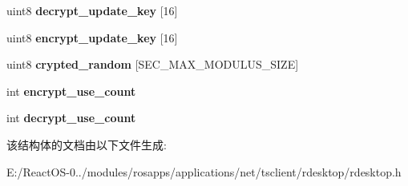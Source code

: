 \begin{DoxyCompactItemize}
\item 
\mbox{\label{structrdpclient_1_1secure___a1c40aa88dfaa8218e1d603a971c9988f}} 
uint8 {\bfseries decrypt\+\_\+update\+\_\+key} \mbox{[}16\mbox{]}
\item 
\mbox{\label{structrdpclient_1_1secure___ae2932b7561d9cf3202110db0490ae24f}} 
uint8 {\bfseries encrypt\+\_\+update\+\_\+key} \mbox{[}16\mbox{]}
\item 
\mbox{\label{structrdpclient_1_1secure___a4ef01c562df6eb7a27c66c1d5bf3df84}} 
uint8 {\bfseries crypted\+\_\+random} \mbox{[}S\+E\+C\+\_\+\+M\+A\+X\+\_\+\+M\+O\+D\+U\+L\+U\+S\+\_\+\+S\+I\+ZE\mbox{]}
\item 
\mbox{\label{structrdpclient_1_1secure___a6445915013833f3a2829bf6e5526ce86}} 
int {\bfseries encrypt\+\_\+use\+\_\+count}
\item 
\mbox{\label{structrdpclient_1_1secure___a94ff8a210d5acd1b722e16b16f680dd9}} 
int {\bfseries decrypt\+\_\+use\+\_\+count}
\end{DoxyCompactItemize}


该结构体的文档由以下文件生成\+:\begin{DoxyCompactItemize}
\item 
E\+:/\+React\+O\+S-\/0../modules/rosapps/applications/net/tsclient/rdesktop/rdesktop.\+h\end{DoxyCompactItemize}

